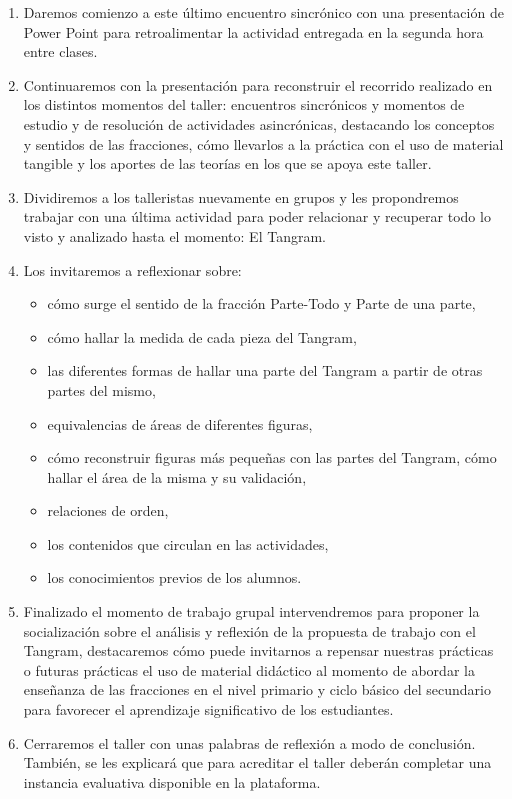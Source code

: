 \begin{enumerate}
	\item Daremos comienzo a este último encuentro sincrónico con una presentación de Power Point para retroalimentar la actividad entregada en la segunda hora entre clases.
	\item Continuaremos con la presentación para reconstruir el recorrido realizado en los distintos momentos del taller: encuentros sincrónicos y momentos de estudio y de resolución de actividades asincrónicas, destacando los conceptos y sentidos de las fracciones, cómo llevarlos a la práctica con el uso de material tangible y los aportes de las teorías en los que se apoya este taller.
	\item Dividiremos a los talleristas nuevamente en grupos y les propondremos trabajar con una última actividad para poder relacionar y recuperar todo lo visto y analizado hasta el momento: El Tangram.
	\item Los invitaremos a reflexionar sobre:
	\begin{itemize}
		\item cómo surge el sentido de la fracción Parte-Todo y Parte de una parte,
		\item cómo hallar la medida de cada pieza del Tangram,
		\item las diferentes formas de hallar una parte del Tangram a partir de otras partes del mismo,
		\item equivalencias de áreas de diferentes figuras,
		\item cómo reconstruir figuras más pequeñas con las partes del Tangram, cómo hallar el área de la misma y su validación,
		\item relaciones de orden,
		\item los contenidos que circulan en las actividades,
		\item los conocimientos previos de los alumnos.
	\end{itemize}
	\item Finalizado el momento de trabajo grupal intervendremos para proponer la socialización sobre el análisis y reflexión de la propuesta de trabajo con el Tangram, destacaremos cómo puede invitarnos a repensar nuestras prácticas o futuras prácticas el uso de material didáctico al momento de abordar la enseñanza de las fracciones en el nivel primario y ciclo básico del secundario para favorecer el aprendizaje significativo de los estudiantes.
	\item Cerraremos el taller con unas palabras de reflexión a modo de conclusión. También, se les explicará que para acreditar el taller deberán completar una instancia evaluativa disponible en la plataforma.
\end{enumerate}

